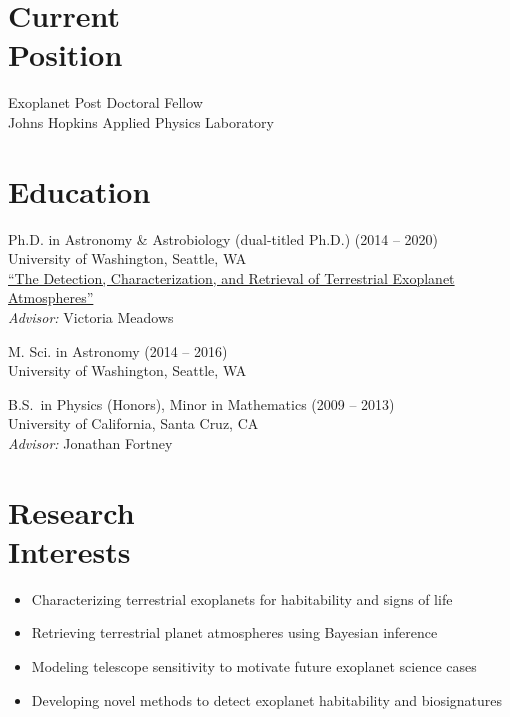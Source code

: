 \documentclass[margin,10pt]{res}
\begin{document}
\begin{resume}

\section{Current \\Position}
Exoplanet Post Doctoral Fellow \\
Johns Hopkins Applied Physics Laboratory \\


\section{Education} 
Ph.D. in Astronomy \& Astrobiology (dual-titled Ph.D.) \hfill (2014 -- 2020) \\
University of Washington, Seattle, WA  \\
\href{https://digital.lib.washington.edu/researchworks/handle/1773/46370}{``The Detection, Characterization, and Retrieval of Terrestrial Exoplanet Atmospheres''} \\
\textit{Advisor:} Victoria Meadows 

M. Sci. in Astronomy \hfill (2014 -- 2016) \\
University of Washington, Seattle, WA 

B.S.\ in Physics (Honors), Minor in Mathematics \hfill (2009 -- 2013) \\
University of California, Santa Cruz, CA \\
\textit{Advisor:} Jonathan Fortney \\

\section{Research \\Interests}
                \begin{itemize}  \itemsep -1pt %
                        \item Characterizing terrestrial exoplanets for habitability and signs of life 
                        \item Retrieving terrestrial planet atmospheres using Bayesian inference 
                        \item Modeling telescope sensitivity to motivate future exoplanet science cases 
                        \item Developing novel methods to detect exoplanet habitability and biosignatures \\
                    \end{itemize}


\end{resume}
\end{document}
